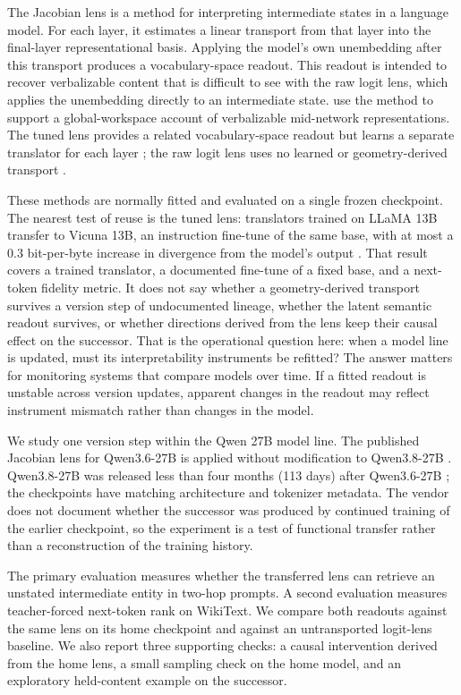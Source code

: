 \documentclass[10pt,a4paper,twocolumn]{article}
\begin{document}
The Jacobian lens is a method for interpreting intermediate states in a
language model. For each layer, it estimates a linear transport from that
layer into the final-layer representational basis. Applying the model's own
unembedding after this transport produces a vocabulary-space readout. This
readout is intended to recover verbalizable content that is difficult to see
with the raw logit lens, which applies the unembedding directly to an
intermediate state. \citet{gurnee2026workspace} use the method to support a
global-workspace account of verbalizable mid-network representations. The
tuned lens provides a related vocabulary-space readout but learns a separate
translator for each layer \citep{belrose2023tuned}; the raw logit lens uses no
learned or geometry-derived transport \citep{nostalgebraist2020logitlens}.

These methods are normally fitted and evaluated on a single frozen checkpoint. The nearest test of reuse is the tuned lens: translators trained on LLaMA 13B transfer to Vicuna 13B, an instruction fine-tune of the same base, with at most a 0.3 bit-per-byte increase in divergence from the model's output \citep{belrose2023tuned}. That result covers a trained translator, a documented fine-tune of a fixed base, and a next-token fidelity metric. It does not say whether a geometry-derived transport survives a version step of undocumented lineage, whether the latent semantic readout survives, or whether directions derived from the lens keep their causal effect on the successor. That is the operational question here: when a model line is updated, must its interpretability instruments be refitted? The answer matters for monitoring systems that compare models over time. If a
fitted readout is unstable across version updates, apparent changes in the
readout may reflect instrument mismatch rather than changes in the model.

We study one version step within the Qwen 27B model line. The published
Jacobian lens for Qwen3.6-27B \citep{neuronpedia2026lens} is applied without
modification to Qwen3.8-27B \citep{qwen38card}. Qwen3.8-27B was released
less than four months (113 days) after Qwen3.6-27B \citep{qwen36card,qwen38card}; the checkpoints have
matching architecture and tokenizer metadata. The vendor does not document
whether the successor was produced by continued training of the earlier
checkpoint, so the experiment is a test of functional transfer rather than a
reconstruction of the training history.

The primary evaluation measures whether the transferred lens can retrieve an
unstated intermediate entity in two-hop prompts. A second evaluation measures
teacher-forced next-token rank on WikiText. We compare both readouts against
the same lens on its home checkpoint and against an untransported logit-lens
baseline. We also report three supporting checks: a causal intervention
derived from the home lens, a small sampling check on the home model, and an
exploratory held-content example on the successor.
\end{document}
